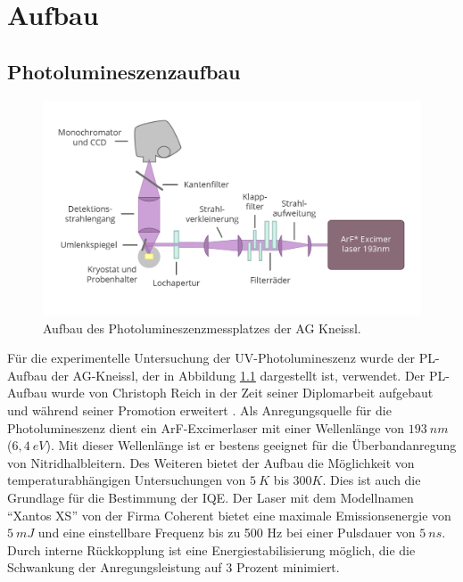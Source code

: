 
\chapter{Aufbau}


\thispagestyle{fancy}
\label{chap:aufbau}
\section{Photolumineszenzaufbau}
\begin{figure}[!htb]
    \centering
    \begin{minipage}[t]{\linewidth}
        \centering
        \includegraphics[width=0.8\linewidth]{Bilder/aufbauPL.png}
        \caption{Aufbau des Photolumineszenzmessplatzes der AG Kneissl. }
        \label{fig:plaufbau}
    \end{minipage}%
\end{figure}
\noindent
Für die experimentelle Untersuchung der UV-Photolumineszenz wurde der PL-Aufbau der AG-Kneissl, der in Abbildung \ref{fig:plaufbau} dargestellt ist, verwendet. Der PL-Aufbau wurde von Christoph Reich in der Zeit seiner Diplomarbeit aufgebaut und während seiner Promotion erweitert \cite{creich}. 
Als Anregungsquelle für die Photolumineszenz dient ein ArF-Excimerlaser mit einer Wellenlänge von $193 \ nm$ ($6,4 \ eV$). Mit dieser Wellenlänge ist er bestens geeignet für die Überbandanregung von Nitridhalbleitern. 
Des Weiteren bietet der Aufbau die Möglichkeit von temperaturabhängigen Untersuchungen von $5 \ K $ bis $300 K$. Dies ist auch die Grundlage für die Bestimmung der IQE. 
\newline
Der Laser mit dem Modellnamen "`Xantos XS"' von der Firma Coherent bietet eine maximale Emissionsenergie von $ 5 \ mJ $ und eine einstellbare Frequenz bis zu 500 Hz bei einer Pulsdauer von $5 \ ns$.
Durch interne Rückkopplung ist eine Energiestabilisierung möglich, die die Schwankung der Anregungsleistung auf 3 Prozent minimiert. 
